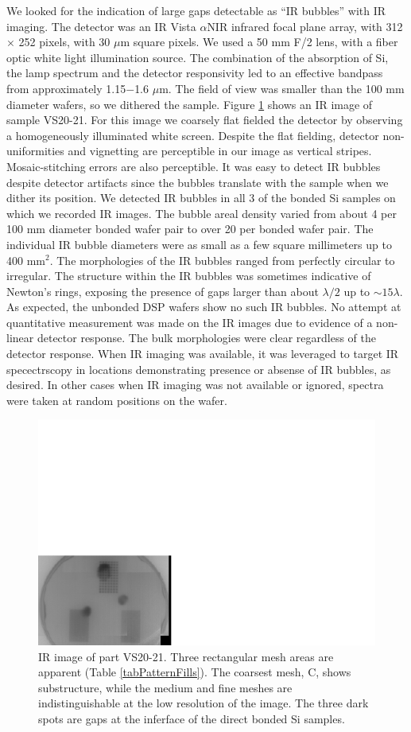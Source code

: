 \documentclass[osajnl,preprint,showpacs,superscriptaddress,12pt]{revtex4-1} %
\begin{document}
We looked for the indication of large gaps detectable as ``IR bubbles'' \cite{1992JEMat..21..669M} with IR imaging.  The detector was an IR Vista $\alpha$NIR infrared focal plane array, with 312 $\times$ 252 pixels, with 30 $\mu$m square pixels.  We used a 50 mm F/2 lens, with a fiber optic white light illumination source.  The combination of the absorption of Si, the lamp spectrum and the detector responsivity led to an effective bandpass from approximately 1.15$-$1.6 $\mu$m.  The field of view was smaller than the 100 mm diameter wafers, so we dithered the sample.  Figure \ref{figVS2021_IR_image} shows an IR image of sample VS20-21.  For this image we coarsely flat fielded the detector by observing a homogeneously illuminated white screen. Despite the flat fielding, detector non-uniformities and vignetting are perceptible in our image as vertical stripes.  Mosaic-stitching errors are also perceptible.  It was easy to detect IR bubbles despite detector artifacts since the bubbles translate with the sample when we dither its position.  We detected IR bubbles in all 3 of the bonded Si samples on which we recorded IR images.  The bubble areal density varied from about 4 per 100 mm diameter bonded wafer pair to over 20 per bonded wafer pair.  The individual IR bubble diameters were as small as a few square millimeters up to 400 mm$^2$.  The morphologies of the IR bubbles ranged from perfectly circular to irregular.  The structure within the IR bubbles was sometimes indicative of Newton's rings, exposing the presence of gaps larger than about $\lambda/2$ up to $\sim 15 \lambda$.  As expected, the unbonded DSP wafers show no such IR bubbles.  No attempt at quantitative measurement was made on the IR images due to evidence of a non-linear detector response.  The bulk morphologies were clear regardless of the detector response.  When IR imaging was available, it was leveraged to target IR specectrscopy in locations demonstrating presence or absense of IR bubbles, as desired.  In other cases when IR imaging was not available or ignored, spectra were taken at random positions on the wafer.

\begin{figure}[htbp]
\centerline{\includegraphics[width=0.4\columnwidth]{figs/VS2021_IR_image.pdf}}
\caption{
\label{figVS2021_IR_image}
IR image of part VS20-21. Three rectangular mesh areas are apparent (Table \ref{tabPatternFills}).  The coarsest mesh, C, shows substructure, while the medium and fine meshes are indistinguishable at the low resolution of the image.  The three dark spots are gaps at the inferface of the direct bonded Si samples.}
\end{figure}
\end{document}
